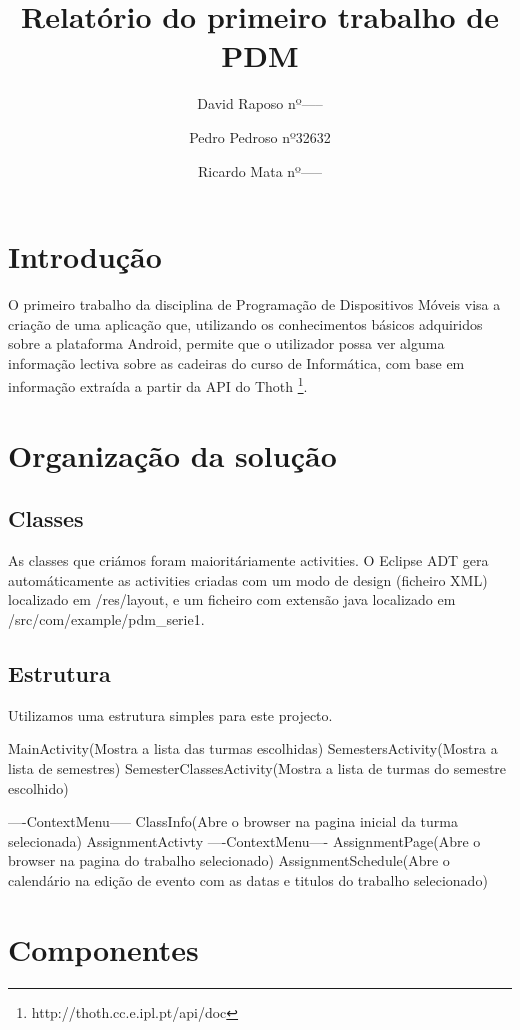 \documentclass{article}
\begin{document}
\title{Relatório do primeiro trabalho de PDM}
\author{David Raposo nº-----\and Pedro Pedroso nº32632 \and Ricardo Mata nº-----}

\maketitle

\section{Introdução}
O primeiro trabalho da disciplina de Programação de Dispositivos Móveis visa a criação de uma aplicação que, utilizando os conhecimentos básicos
adquiridos sobre a plataforma Android, permite que o utilizador possa ver alguma informação lectiva sobre as cadeiras do curso de Informática, com base em
informação extraída a partir da API do Thoth \footnote{http://thoth.cc.e.ipl.pt/api/doc}.

\section{Organização da solução}
\subsection{Classes}
As classes que criámos foram maioritáriamente activities. O Eclipse ADT gera automáticamente as activities criadas com um modo de design (ficheiro XML)
localizado em /res/layout, e um ficheiro com extensão java localizado em /src/com/example/pdm\_serie1.

\subsection{Estrutura}
Utilizamos uma estrutura simples para este projecto.

MainActivity(Mostra a lista das turmas escolhidas) 	
		SemestersActivity(Mostra a lista de semestres)
		SemesterClassesActivity(Mostra a lista de turmas do semestre escolhido)
		
		----ContextMenu-----
		ClassInfo(Abre o browser na pagina inicial da turma selecionada)
		AssignmentActivty
					----ContextMenu----
					AssignmentPage(Abre o browser na pagina do trabalho selecionado)
					AssignmentSchedule(Abre o calendário na edição de evento com as datas e titulos do trabalho selecionado)				
					

\section{Componentes}
\end{document}
